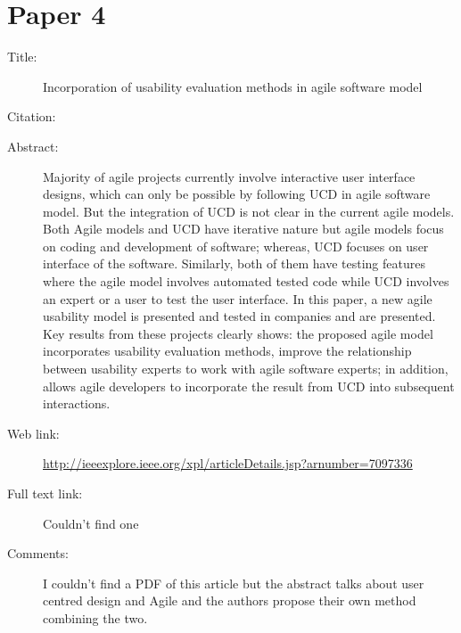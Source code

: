 \documentclass{scrartcl}
\begin{document}
\section*{Paper 4}
\begin{description}
	\item[Title:] 	Incorporation of usability evaluation methods in agile software model	
	\item[Citation:] \cite{Butt}
	\item[Abstract:] Majority of agile projects currently involve interactive user interface designs, which can only be possible by following UCD in agile software model. But the integration of UCD is not clear in the current agile models. Both Agile models and UCD have iterative nature but agile models focus on coding and development of software; whereas, UCD focuses on user interface of the software. Similarly, both of them have testing features where the agile model involves automated tested code while UCD involves an expert or a user to test the user interface. In this paper, a new agile usability model is presented and tested in companies and are presented. Key results from these projects clearly shows: the proposed agile model incorporates usability evaluation methods, improve the relationship between usability experts to work with agile software experts; in addition, allows agile developers to incorporate the result from UCD into subsequent interactions.
	\item[Web link:] \url{http://ieeexplore.ieee.org/xpl/articleDetails.jsp?arnumber=7097336}
	\item[Full text link:] Couldn't find one
	\item[Comments:]  I couldn't find a PDF of this article but the abstract talks about user centred design and Agile and the authors propose their own method combining the two.
\end{description}
\end{document}
